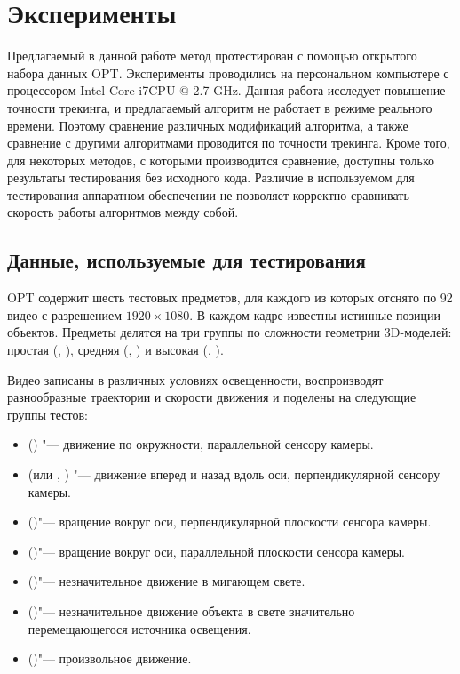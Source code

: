 \section{Эксперименты}\label{experiments}

Предлагаемый в данной работе метод протестирован с помощью открытого набора
данных OPT\cite{OPT}.
Эксперименты проводились на персональном компьютере с процессором Intel Core
i7CPU @ 2.7 GHz.
Данная работа исследует повышение точности трекинга, и предлагаемый алгоритм не
работает в режиме реального времени.
Поэтому сравнение различных модификаций алгоритма, а также сравнение с другими
алгоритмами проводится по точности трекинга.
Кроме того, для некоторых методов, с которыми производится сравнение,
доступны только результаты тестирования без исходного кода.
Различие в используемом для тестирования аппаратном обеспечении не позволяет
корректно сравнивать скорость работы алгоритмов между собой.

\subsection{Данные, используемые для тестирования}

OPT содержит шесть тестовых предметов, для каждого из которых отснято
по 92 видео с разрешением $1920\times1080$.
В каждом кадре известны истинные позиции объектов.
Предметы делятся на три группы по сложности геометрии 3D-моделей: простая
(, ), средняя (, )
и высокая (, ).

Видео записаны в различных условиях освещенности, воспроизводят разнообразные
траектории и скорости движения и поделены на следующие группы тестов:
\begin{itemize}
\item {} () "--- движение по окружности,
параллельной
        сенсору камеры.
\item {} (или , ) "--- движение вперед
и
        назад вдоль оси, перпендикулярной сенсору камеры.
\item {} ()"--- вращение вокруг оси,
перпендикулярной
        плоскости сенсора камеры.
\item {} ()"--- вращение вокруг оси,
параллельной
        плоскости сенсора камеры.
\item {} ()"--- незначительное движение в мигающем
свете.
\item {} ()"--- незначительное движение объекта в
свете значительно
        перемещающегося источника освещения.
    \item {} ()"--- произвольное движение.
\end{itemize}

